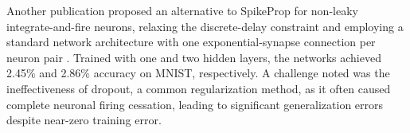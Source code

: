 
\noindent Another publication proposed an alternative to SpikeProp for non-leaky integrate-and-fire neurons, relaxing the discrete-delay constraint and employing a standard network architecture with one exponential-synapse connection per neuron pair \cite{mostafa2017supervised}. Trained with one and two hidden layers, the networks achieved 2.45\% and 2.86\% accuracy on MNIST, respectively. A challenge noted was the ineffectiveness of dropout, a common regularization method, as it often caused complete neuronal firing cessation, leading to significant generalization errors despite near-zero training error.\\




